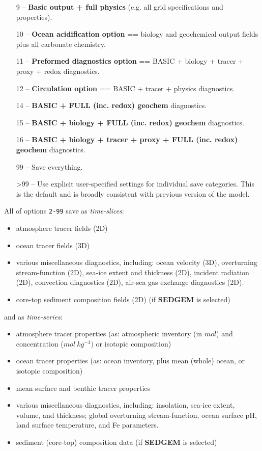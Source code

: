 \documentclass[11pt,fleqn]{book} %
\begin{document}
\begin{itemize}
\item[9] -- \textbf{Basic output + full physics} (e.g. all grid specifications and properties).
\item[10] -- \textbf{Ocean acidification option} == biology and geochemical output fields plus all carbonate chemistry.
\item[11] -- \textbf{Preformed diagnostics option} == BASIC + biology + tracer + proxy + redox diagnostics.
\item[12] -- \textbf{Circulation option} == BASIC + tracer + physics diagnostics.
\item[14] -- \textbf{ BASIC + FULL (inc. redox) geochem} diagnostics.
\item[15] -- \textbf{ BASIC + biology + FULL (inc. redox) geochem} diagnostics.
\item[16] -- \textbf{ BASIC + biology + tracer + proxy + FULL (inc. redox) geochem} diagnostics.
\item[99] -- Save everything.
\item[>99] -- Use explicit user-specified settings for individual save categories. This is the default and is broadly consistent with previous version of the model.

\end{itemize}

\newpage

\noindent All of options \texttt{2-99} save as \textit{time-slices}:
\begin{itemize}[noitemsep]
\setlength{\itemindent}{.2in}
\item atmosphere tracer fields (2D)
\item ocean tracer fields (3D)
\item various miscellaneous diagnostics, including: ocean velocity (3D), overturning stream-function (2D), sea-ice extent and thickness (2D), incident radiation (2D), convection diagnostics (2D), air-sea gas exchange diagnostics (2D).
\item core-top sediment composition fields (2D) (if \textbf{SEDGEM} is selected)
\end{itemize}
and as \textit{time-series}:
\begin{itemize}[noitemsep]
\setlength{\itemindent}{.2in}
\item atmosphere tracer properties (as: atmospheric inventory (in \(mol\)) and concentration (\(mol\:kg^{-1})\) or isotopic composition)
\item ocean tracer properties (as: ocean inventory, plus mean (whole) ocean, or isotopic composition)
\item mean surface and benthic tracer properties
\item various miscellaneous diagnostics, including: insolation, sea-ice extent, volume, and thickness; global overturning stream-function, ocean surface pH, land surface temperature, and Fe parameters.
\item sediment (core-top) composition data (if \textbf{SEDGEM} is selected)
\end{itemize}
\end{document}
